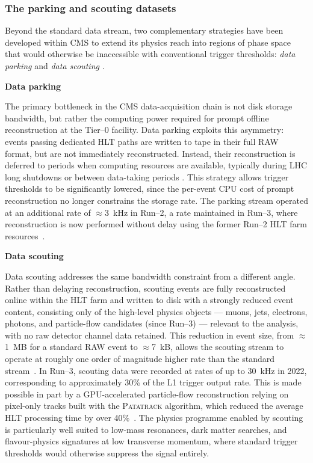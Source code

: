 \subsubsection{The parking and scouting datasets}

Beyond the standard data stream, two complementary strategies have been developed within CMS to extend its physics reach into regions of phase space that would otherwise be inaccessible with conventional trigger thresholds: \textit{data parking} and \textit{data scouting} \cite{ParkingAndScooting}.

\vspace{0.5 cm}
\noindent \textbf{Data parking}
\vspace{0.5 cm}

The primary bottleneck in the CMS data-acquisition chain is not disk storage bandwidth, but rather the computing power required for prompt offline reconstruction at the Tier--0 facility. Data parking exploits this asymmetry: events passing dedicated HLT paths are written to tape in their full RAW format, but are not immediately reconstructed. Instead, their reconstruction is deferred to periods when computing resources are available, typically during LHC long shutdowns or between data-taking periods \cite{CMShlt}. This strategy allows trigger thresholds to be significantly lowered, since the per-event CPU cost of prompt reconstruction no longer constrains the storage rate. The parking stream operated at an additional rate of $\approx$3~kHz in Run--2, a rate maintained in Run--3, where reconstruction is now performed without delay using the former Run--2 HLT farm resources~\cite{ParkingAndScooting}.

\vspace{0.5 cm}
\noindent \textbf{Data scouting}
\vspace{0.5 cm}

Data scouting addresses the same bandwidth constraint from a different angle. Rather than delaying reconstruction, scouting events are fully reconstructed online within the HLT farm and written to disk with a strongly reduced event content, consisting only of the high-level physics objects --- muons, jets, electrons, photons, and particle-flow candidates (since Run--3) --- relevant to the analysis, with no raw detector channel data retained. This reduction in event size, from $\approx$1~MB for a standard RAW event to $\approx$7~kB, allows the scouting stream to operate at roughly one order of magnitude higher rate than the standard stream~\cite{CMStrigger}. In Run--3, scouting data were recorded at rates of up to 30~kHz in 2022, corresponding to approximately 30\% of the L1 trigger output rate. This is made possible in part by a GPU-accelerated particle-flow reconstruction relying on pixel-only tracks built with the \textsc{Patatrack} algorithm, which reduced the average HLT processing time by over 40\%~\cite{ParkingAndScooting}. The physics programme enabled by scouting is particularly well suited to low-mass resonances, dark matter searches, and flavour-physics signatures at low transverse momentum, where standard trigger thresholds would otherwise suppress the signal entirely.



